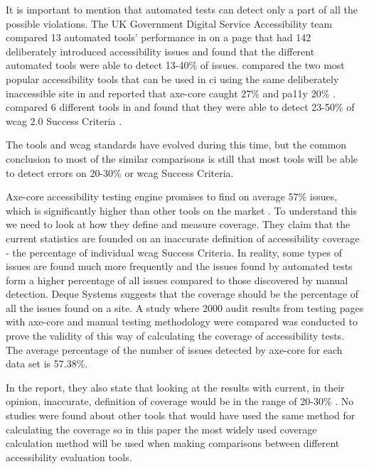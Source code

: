 \documentclass{master_thesis}
\begin{document}
It is important to mention that automated tests can detect only a part of all the possible violations. The UK Government Digital Service Accessibility team compared 13 automated tools' performance in \citeyear{GAT2018} on a page that had 142 deliberately introduced accessibility issues and found that the different automated tools were able to detect 13-40\% of issues. \citeauthor{Abbott2021} compared the two most popular accessibility tools that can be used in \ac{ci} using the same deliberately inaccessible site in \citeyear{Abbott2021} and reported that axe-core caught 27\% and pa11y 20\% \citep{Abbott2021}. \citeauthor{Vigo2013} compared 6 different tools in \citeyear{Vigo2013} and found that they were able to detect 23-50\% of  \ac{wcag} 2.0 Success Criteria \citep{GAT2018, Abbott2021, Vigo2013}.

The tools and \ac{wcag} standards have evolved during this time, but the common conclusion to most of the similar comparisons is still that most tools will be able to detect errors on 20-30\% or \ac{wcag} Success Criteria. 

Axe-core accessibility testing engine promises to find on average 57\% issues, which is significantly higher than other tools on the market \citep{Deque2023}. To understand this we need to look at how they define and measure coverage. They claim that the current statistics are founded on an inaccurate definition of accessibility coverage - the percentage of individual \ac{wcag} Success Criteria. In reality, some types of issues are found much more frequently and the issues found by automated tests form a higher percentage of all issues compared to those discovered by manual detection. Deque Systems suggests that the coverage should be the percentage of all the issues found on a site. A study where 2000 audit results from testing pages with axe-core and manual testing methodology were compared was conducted to prove the validity of this way of calculating the coverage of accessibility tests\citep{DequeSystems2021report}. The average percentage of the number of issues detected by axe-core for each data set is 57.38\%.

In the report, they also state that looking at the results with current, in their opinion, inaccurate, definition of coverage would be in the range of 20-30\% \citep{DequeSystems2021report}. No studies were found about other tools that would have used the same method for calculating the coverage so in this paper the most widely used coverage calculation method will be used when making comparisons between different accessibility evaluation tools.
\end{document}
